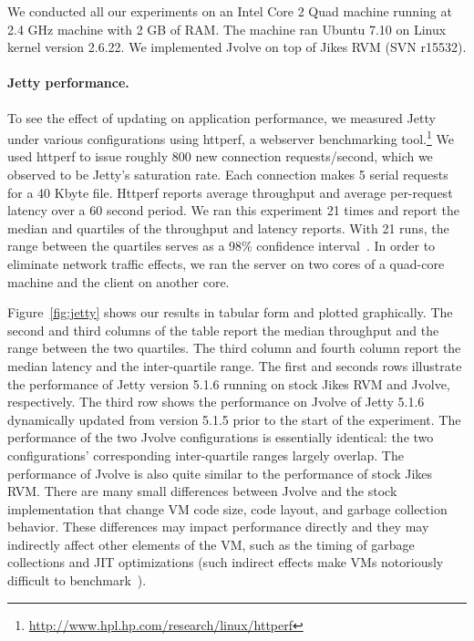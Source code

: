 \documentclass[9pt]{sigplanconf}
\newcommand{\DSU}{{\sc Jvolve}}
\newcommand{\JikesRVM}{Jikes RVM}
\newcommand{\JRVMVersion}{Jikes RVM (SVN r15532)}
\begin{document}
We conducted all our experiments on an Intel Core 2 Quad machine running at 2.4 GHz machine with 2 GB of RAM.
The machine ran Ubuntu 7.10 on Linux kernel version 2.6.22. We implemented
\DSU{} on top of \JRVMVersion{}.


% 
% 
% 

\paragraph{Jetty performance.}
To see the effect of updating on application performance, we measured Jetty
under various configurations using httperf, a webserver
benchmarking tool.\footnote{\url{http://www.hpl.hp.com/research/linux/httperf}}  We used httperf to issue roughly 800 new connection
requests/second, which we observed to be Jetty's saturation rate.
Each connection makes 5 serial requests for a 40 Kbyte file. Httperf
reports average throughput and average per-request latency over a 60 second period. We
ran this experiment 21 times and report the median and
quartiles of the throughput and latency reports. With 21 runs, the range between
the quartiles serves as a 98\% conﬁdence interval~\cite{PrattGibbons81}.
In order to eliminate network traffic
effects, we ran the server on two cores of a quad-core machine and the
client on another core.

Figure~\ref{fig:jetty} shows our results in tabular form and plotted graphically.  The second and third columns
of the table
report the median throughput and the range between the two quartiles.
The third column and fourth column report the median latency and the
inter-quartile range.  The
first and seconds rows illustrate the performance of Jetty version 5.1.6
running on stock \JikesRVM{} and \DSU, respectively. The third row shows
the performance on \DSU{} of Jetty 5.1.6 dynamically updated from version
5.1.5 prior to the start of the experiment.
The performance of the two \DSU{} configurations
is essentially identical: the two configurations' corresponding
inter-quartile ranges largely overlap.
The performance of \DSU{} is also quite similar to the performance of
stock \JikesRVM.  There are many small differences between \DSU{} and the stock
implementation that change VM code size, code layout, and garbage
collection behavior.  These differences may impact performance
directly and they may indirectly affect other elements of the VM,
such as the timing of garbage collections and JIT
optimizations (such indirect effects make VMs notoriously difficult to
benchmark~\cite{dacapo-cacm}).
\end{document}
